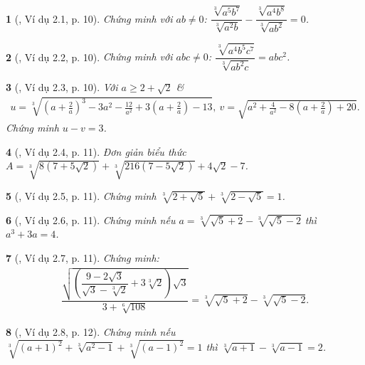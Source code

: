 \documentclass{article}
\newtheorem{baitoan}{}
\begin{document}
\begin{baitoan}[\cite{TLCT_THCS_Toan_9_dai_so}, Ví dụ 2.1, p. 10]
	Chứng minh với $ab\ne0$: $\dfrac{\sqrt[3]{a^5b^7}}{\sqrt[3]{a^2b}} - \dfrac{\sqrt[3]{a^4b^8}}{\sqrt[3]{ab^2}} = 0$.
\end{baitoan}

\begin{baitoan}[\cite{TLCT_THCS_Toan_9_dai_so}, Ví dụ 2.2, p. 10]
	Chứng minh với $abc\ne0$: $\dfrac{\sqrt[3]{a^4b^5c^7}}{\sqrt[3]{ab^2c}} = abc^2$.
\end{baitoan}

\begin{baitoan}[\cite{TLCT_THCS_Toan_9_dai_so}, Ví dụ 2.3, p. 10]
	Với $a\ge2 + \sqrt{2}$ \&
	\begin{align*}
		u = \sqrt[3]{\left(a + \frac{2}{a}\right)^3 - 3a^2 - \frac{12}{a^2} + 3\left(a + \frac{2}{a}\right) - 13},\ v = \sqrt{a^2 + \frac{4}{a^2} - 8\left(a + \frac{2}{a}\right) + 20}.
	\end{align*}
	Chứng minh $u - v = 3$.
\end{baitoan}

\begin{baitoan}[\cite{TLCT_THCS_Toan_9_dai_so}, Ví dụ 2.4, p. 11]
	Đơn giản biểu thức $A = \sqrt[3]{8(7 + 5\sqrt{2})} + \sqrt[3]{216(7 - 5\sqrt{2})} + 4\sqrt{2} - 7$.
\end{baitoan}

\begin{baitoan}[\cite{TLCT_THCS_Toan_9_dai_so}, Ví dụ 2.5, p. 11]
	Chứng minh $\sqrt[3]{2 + \sqrt{5}} + \sqrt[3]{2 - \sqrt{5}} = 1$.
\end{baitoan}

\begin{baitoan}[\cite{TLCT_THCS_Toan_9_dai_so}, Ví dụ 2.6, p. 11]
	Chứng minh nếu $a = \sqrt[3]{\sqrt{5} + 2} - \sqrt[3]{\sqrt{5} - 2}$ thì $a^3 + 3a = 4$.
\end{baitoan}

\begin{baitoan}[\cite{TLCT_THCS_Toan_9_dai_so}, Ví dụ 2.7, p. 11]
	Chứng minh:
	\begin{align*}
		\dfrac{\sqrt{\left(\dfrac{9 - 2\sqrt{3}}{\sqrt{3} - \sqrt[3]{2}} + 3\sqrt[3]{2}\right)\sqrt{3}}}{3 + \sqrt[6]{108}} = \sqrt[3]{\sqrt{5} + 2} - \sqrt[3]{\sqrt{5} - 2}.
	\end{align*}
\end{baitoan}

\begin{baitoan}[\cite{TLCT_THCS_Toan_9_dai_so}, Ví dụ 2.8, p. 12]
	Chứng minh nếu $\sqrt[3]{(a + 1)^2} + \sqrt[3]{a^2 - 1} + \sqrt[3]{(a - 1)^2} = 1$ thì $\sqrt[3]{a + 1} - \sqrt[3]{a - 1} = 2$.
\end{baitoan}
\end{document}
